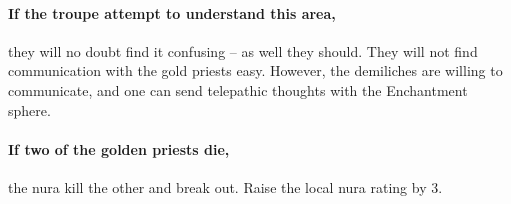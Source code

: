 \paragraph{If the troupe attempt to understand this area,}
they will no doubt find it confusing -- as well they should.
They will not find communication with the gold priests easy.
However, the demiliches are willing to communicate, and one can send telepathic thoughts with the Enchantment sphere.

\paragraph{If two of the golden priests die,}
the nura kill the other and break out.
Raise the local nura rating by 3.


